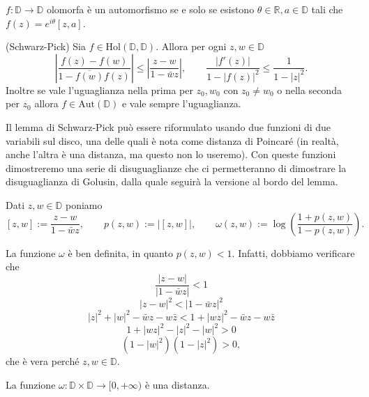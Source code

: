 \begin{prop} \label{aut}
  $f:\mathbb{D} \longrightarrow \mathbb{D}$ olomorfa è un automorfismo se e solo se esistono $\theta \in \mathbb{R}, a \in \mathbb{D}$ tali che $f(z)=e^{i\theta}[z,a]$.
\end{prop}

\begin{lm} \label{SP}
  (Schwarz-Pick) Sia $f \in \text{Hol}(\mathbb{D},\mathbb{D})$.
  Allora per ogni $z, w \in \mathbb{D}$
  $$\left|\frac{f(z)-f(w)}{1-\overline{f(w)}f(z)}\right| \le \left|\frac{z-w}{1-\bar{w}z}\right|, \qquad \frac{|f'(z)|}{1-|f(z)|^2} \le \frac{1}{1-|z|^2}.$$
  Inoltre se vale l'uguaglianza nella prima per $z_0, w_0$ con $z_0 \not=w_0$ o nella seconda per $z_0$ allora $f \in \text{Aut}(\mathbb{D})$ e vale sempre l'uguaglianza.
\end{lm}

Il lemma di Schwarz-Pick può essere riformulato usando due funzioni di due variabili sul disco, una delle quali è nota come distanza di Poincaré (in realtà, anche l'altra è una distanza, ma questo non lo useremo). Con queste funzioni dimostreremo una serie di disuguaglianze che ci permetteranno di dimostrare la disuguaglianza di Golusin, dalla quale seguirà la versione al bordo del lemma.

\begin{defn}
  Dati $z, w \in \mathbb{D}$ poniamo
  $$[z,w]:=\frac{z-w}{1-\bar{w}z}, \qquad p(z,w):=|[z,w]|, \qquad \omega(z,w):=\log\left(\frac{1+p(z,w)}{1-p(z,w)}\right).$$
\end{defn}

La funzione $\omega$ è ben definita, in quanto $p(z,w)<1$. Infatti, dobbiamo verificare che
  $$\frac{|z-w|}{|1-\bar{w}z|} < 1$$
  $$|z-w|^2 < |1-\bar{w}z|^2$$
  $$|z|^2+|w|^2-\bar{w}z-w\bar{z} < 1+|wz|^2-\bar{w}z-w\bar{z}$$
  $$1+|wz|^2-|z|^2-|w|^2 > 0$$
  $$(1-|w|^2)(1-|z|^2) > 0,$$
che è vera perché $z, w \in \mathbb{D}$.

\begin{prop}
  La funzione $\omega: \mathbb{D}\times \mathbb{D} \longrightarrow [0,+\infty)$ è una distanza.
\end{prop}

